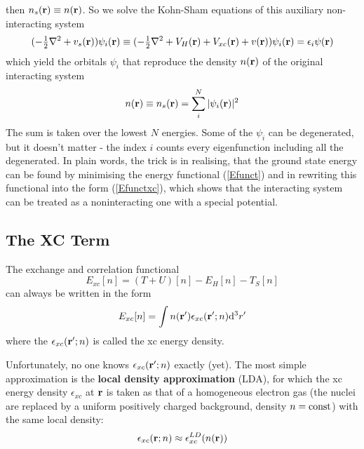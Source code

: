 then $n_s({\bf r})\equiv n({\bf r})$. So we solve the Kohn-Sham equations of this auxiliary non-interacting system 
\begin{equation}
  (-{\textstyle{1\over2}}\nabla^2+v_s({\bf r}))\psi_i({\bf r}) \equiv(-{\textstyle{1\over2}}\nabla^2+V_H({\bf r})+V_{xc}({\bf r})+v({\bf r}))\psi_i({\bf r}) =\epsilon_i\psi({\bf r})  \label{KSeq}
\end{equation}
which yield the orbitals $\psi_i$ that reproduce the density $n({\bf r})$ of the original interacting system 
\begin{equation}
  n({\bf r})\equiv n_s({\bf r})=\sum_i^N|\psi_i({\bf r})|^2  \label{KSdensity}
\end{equation}
The sum is taken over the lowest $N$ energies. Some of the $\psi_i$ can be degenerated, but it doesn't matter - the index $i$ counts every eigenfunction including all the degenerated. In plain words, the trick is in realising, that the ground state energy can be found by minimising the energy functional (\ref{Efunct}) and in rewriting this functional into the form (\ref{Efunctxc}), which shows that the interacting system can be treated as a noninteracting one with a special potential.

\subsection{The XC Term}

The exchange and correlation functional 
\begin{equation*}
  E_{xc}[n]=(T+U)[n]-E_H[n]-T_S[n]
\end{equation*}
can always be written in the form 
\begin{equation*}
  E_{xc}[n]=\int n({\bf r}')\epsilon_{xc}({\bf r}';n){\rm d}^3r'
\end{equation*}
where the $\epsilon_{xc}({\bf r}';n)$ is called the xc energy density.

Unfortunately, no one knows $\epsilon_{xc}({\bf r}';n)$ exactly (yet). The most simple approximation is the \textbf{local density approximation} (LDA), for which the xc energy density $\epsilon_{xc}$ at $\bf r$ is taken as that of a homogeneous electron gas (the nuclei are replaced by a uniform positively charged background, density $n=\rm const$) with the same local density: 
\begin{equation*}
  \epsilon_{xc}({\bf r};n)\approx\epsilon_{xc}^{LD}(n({\bf r}))
\end{equation*}

